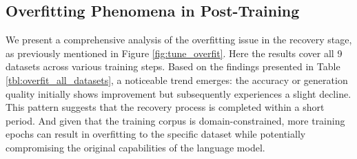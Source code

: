 \subsection{Overfitting Phenomena in Post-Training} \label{sec:apx_overfit}
We present a comprehensive analysis of the overfitting issue in the recovery stage, as previously mentioned in Figure \ref{fig:tune_overfit}. Here the results cover all 9 datasets across various training steps. Based on the findings presented in Table \ref{tbl:overfit_all_datasets}, a noticeable trend emerges: the accuracy or generation quality initially shows improvement but subsequently experiences a slight decline. This pattern suggests that the recovery process is completed within a short period. And given that the training corpus is domain-constrained, more training epochs can result in overfitting to the specific dataset while potentially compromising the original capabilities of the language model.

\begin{table}[h]
    \centering
    \vspace{-5mm}
    \caption{The PPL and Accuracy on different training steps} \label{tbl:overfit_all_datasets}
\end{table}

